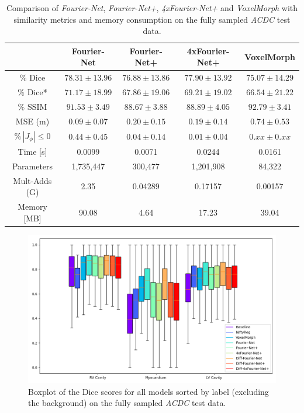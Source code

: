 \documentclass[english,version-2022-01]{uzl-thesis} %
\begin{document}
\begin{table}[h] %
	\centering
	\caption{Comparison of \emph{Fourier-Net}, \emph{Fourier-Net+}, \emph{4xFourier-Net+} and \emph{VoxelMorph} with similarity metrics and memory consumption on the fully sampled \emph{ACDC} test data.}
	\label{tab:CompareVoxelMorph}
	\begin{tabular}{c c c c c} %
		\toprule
		 & Fourier-Net & Fourier-Net+ & 4xFourier-Net+ & VoxelMorph \\		
		\midrule
		$\%$ Dice & $78.31 \pm 13.96$ & $76.88 \pm 13.86$ & $77.90 \pm 13.92$ & $75.07 \pm 14.29$ \\
		$\%$ Dice* & $71.17 \pm 18.99$ & $67.86 \pm 19.06$ & $69.21 \pm 19.02$ & $66.54 \pm 21.22$ \\
		$\%$ SSIM & $91.53 \pm 3.49$ & $88.67 \pm 3.88$ & $88.89 \pm 4.05$ & $92.79 \pm 3.41$ \\
		MSE (m) & $0.09 \pm 0.07$ & $0.20 \pm 0.15$ & $0.19 \pm 0.14$ & $0.74 \pm 0.53$ \\
		$\% \, |J_{\phi}|\leq0$ & $0.44 \pm 0.45$ & $0.04 \pm 0.14$ & $0.01 \pm 0.04$ & $0.xx \pm 0.xx$ \\
		Time [s] 	  & 0.0099    & 0.0071 	& 0.0244  	& 0.0161 \\
		Parameters 	  & 1,735,447 & 300,477 	& 1,201,908 	& 84,322 \\
		Mult-Adds (G) & 2.35      & 0.04289  & 0.17157  	& 0.00157 \\
		Memory [MB] 	  & 90.08     & 4.64   	& 17.23    	& 39.04 \\
		\bottomrule
	\end{tabular}		
\end{table}


\begin{figure}[H] %
	\centering
	\graphicspath{{images/}{\main/images/}}
	\includegraphics[width=\linewidth]{Boxplot_DiceScores_FullySampled.png} 
	\caption{Boxplot of the Dice scores for all models sorted by label (excluding the background) on the fully sampled \emph{ACDC} test data.}
	\label{fig:Boxplot_DiceScores}
\end{figure}
\end{document}
